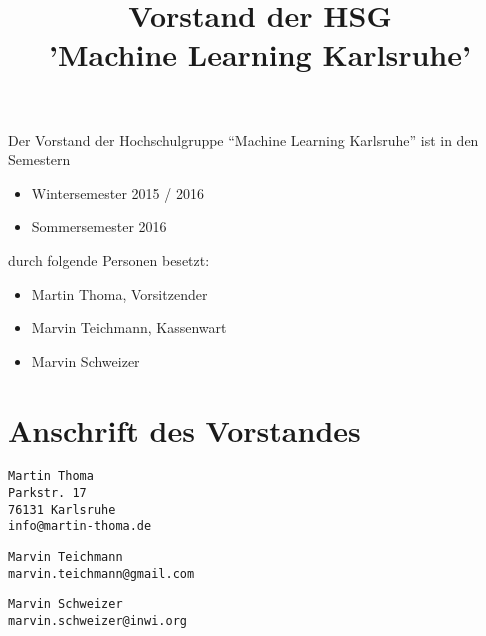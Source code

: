 \documentclass[a4paper]{scrartcl}
\title{Vorstand der HSG\\'Machine Learning Karlsruhe'}
\author{}
\begin{document}
\maketitle

Der Vorstand der Hochschulgruppe \enquote{Machine Learning Karlsruhe}
ist in den Semestern

\begin{itemize}
    \item Wintersemester 2015 / 2016
    \item Sommersemester 2016
\end{itemize}

durch folgende Personen besetzt:

\begin{itemize}
    \item Martin Thoma, Vorsitzender
    \item Marvin Teichmann, Kassenwart
    \item Marvin Schweizer
\end{itemize}

\section*{Anschrift des Vorstandes}

\begin{verbatim}
Martin Thoma
Parkstr. 17
76131 Karlsruhe
info@martin-thoma.de
\end{verbatim}

\begin{verbatim}
Marvin Teichmann
marvin.teichmann@gmail.com
\end{verbatim}

\begin{verbatim}
Marvin Schweizer
marvin.schweizer@inwi.org
\end{verbatim}
\end{document}
